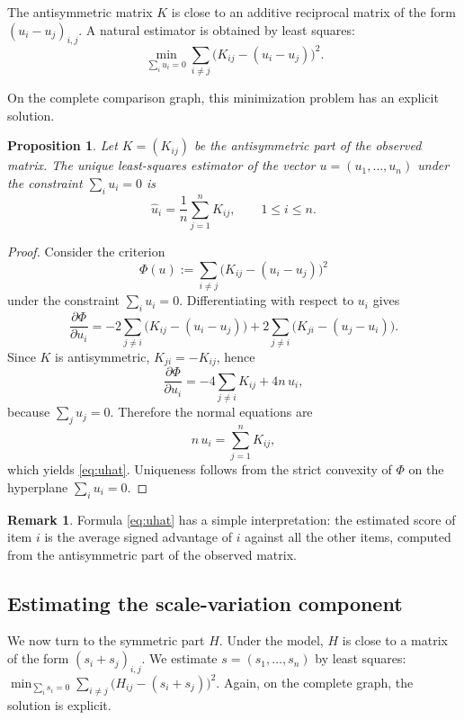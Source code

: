 \documentclass[11pt]{amsart}
\theoremstyle{definition}
\newtheorem{remark}[definition]{Remark}
\theoremstyle{plain}
\newtheorem{proposition}[definition]{Proposition}
\numberwithin{equation}{section}
\begin{document}
The antisymmetric matrix $K$ is close to an additive reciprocal matrix of the form
\(
(u_i-u_j)_{i,j}.
\)
A natural estimator is obtained by least squares:
\[
\min_{\sum_i u_i=0}
\sum_{i\neq j}\bigl(K_{ij}-(u_i-u_j)\bigr)^2.
\]

On the complete comparison graph, this minimization problem has an explicit solution.

\begin{proposition}
Let $K=(K_{ij})$ be the antisymmetric part of the observed matrix. The unique least-squares estimator of the vector $u=(u_1,\dots,u_n)$ under the constraint $\sum_i u_i=0$ is
\begin{equation}\label{eq:uhat}
\widehat u_i=\frac1n\sum_{j=1}^n K_{ij},
\qquad 1\le i\le n.
\end{equation}
\end{proposition}

\begin{proof}
Consider the criterion
\[
\Phi(u):=\sum_{i\neq j}\bigl(K_{ij}-(u_i-u_j)\bigr)^2
\]
under the constraint $\sum_i u_i=0$. Differentiating with respect to $u_i$ gives
\[
\frac{\partial \Phi}{\partial u_i}
=
-2\sum_{j\neq i}\bigl(K_{ij}-(u_i-u_j)\bigr)
+2\sum_{j\neq i}\bigl(K_{ji}-(u_j-u_i)\bigr).
\]
Since $K$ is antisymmetric, $K_{ji}=-K_{ij}$, hence
\[
\frac{\partial \Phi}{\partial u_i}
=
-4\sum_{j\neq i}K_{ij}
+4n\,u_i,
\]
because $\sum_j u_j=0$. Therefore the normal equations are
\[
n\,u_i=\sum_{j=1}^n K_{ij},
\]
which yields \eqref{eq:uhat}. Uniqueness follows from the strict convexity of $\Phi$ on the hyperplane $\sum_i u_i=0$.
\end{proof}

\begin{remark}
Formula \eqref{eq:uhat} has a simple interpretation: the estimated score of item $i$ is the average signed advantage of $i$ against all the other items, computed from the antisymmetric part of the observed matrix.
\end{remark}

\subsection{Estimating the scale-variation component}

We now turn to the symmetric part $H$. Under the model, $H$ is close to a matrix of the form
\(
(s_i+s_j)_{i,j}.
\)
We estimate $s=(s_1,\dots,s_n)$ by least squares:
\(
\min_{\sum_i s_i=0}
\sum_{i\neq j}\bigl(H_{ij}-(s_i+s_j)\bigr)^2.
\)
Again, on the complete graph, the solution is explicit.
\end{document}
